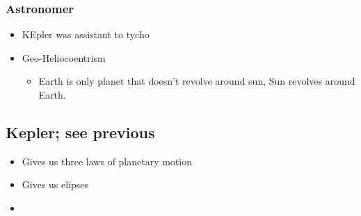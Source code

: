\documentclass[11pt]{article}
\begin{document}
\subsubsection{Astronomer}
\label{sec-10-4-2}
\begin{itemize}
\item KEpler was assistant to tycho
\item Geo-Heliocoentrism
\begin{itemize}
\item Earth is only planet that doesn't revolve around sun, Sun revolves around Earth.
\end{itemize}
\end{itemize}

\subsection{Kepler; see previous}
\label{sec-10-5}
\begin{itemize}
\item Gives us three laws of planetary motion
\item Gives us elipses
\item 
\end{itemize}
\end{document}
